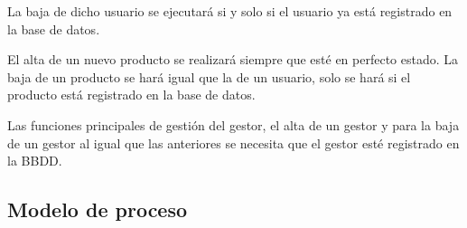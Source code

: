 \noindent La baja de dicho usuario se ejecutará si y solo si el usuario ya está registrado en la base de datos.

El alta de un nuevo producto se realizará siempre que esté en perfecto estado. La baja de un producto se hará igual que la de un usuario, solo se hará si el producto está registrado en la base de datos.

Las funciones principales de gestión del gestor, el alta de un gestor y para la baja de un gestor al igual que las anteriores se necesita que el gestor esté registrado en la BBDD.

\subsection{Modelo de proceso}
